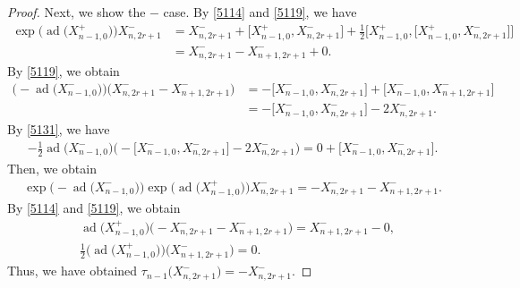 \documentclass[10pt,a4paper]{amsart}
\numberwithin{equation}{section}
\theoremstyle{definition}
\DeclareMathOperator{\ad}{ad}
\begin{document}
\begin{proof}
Next, we show the $-$ case. By \eqref{5114} and \eqref{5119}, we have
\begin{align*}
\exp\bigl(\ad\bigl(X^+_{n-1,0}\bigr)\bigr)X^-_{n,2r+1}&=X^-_{n,2r+1}+\bigl[X^+_{n-1,0},X^-_{n,2r+1}\bigr]+\frac{1}{2}\bigl[X^+_{n-1,0},\bigl[X^+_{n-1,0},X^-_{n,2r+1}\bigr]\bigr]\\
&=X^-_{n,2r+1}-X^-_{n+1,2r+1}+0.
\end{align*}
By \eqref{5119}, we obtain
\begin{align*}
\bigl(-\ad\bigl(X^-_{n-1,0}\bigr)\bigr)\bigl(X^-_{n,2r+1}-X^-_{n+1,2r+1}\bigr)&=-\bigl[X^-_{n-1,0},X^-_{n,2r+1}\bigr]+\bigl[X^-_{n-1,0},X^-_{n+1,2r+1}\bigr]\\
&=-\bigl[X^-_{n-1,0},X^-_{n,2r+1}\bigr]-2X^-_{n,2r+1}.
\end{align*}
By \eqref{5131}, we have
\begin{align*}
-\frac{1}{2}\ad\bigl(X^-_{n-1,0}\bigr)\bigl(-\bigl[X^-_{n-1,0},X^-_{n,2r+1}\bigr]-2X^-_{n,2r+1}\bigr)=0+\bigl[X^-_{n-1,0},X^-_{n,2r+1}\bigr].
\end{align*}
Then, we obtain
\begin{align*}
\exp\bigl(-\ad\bigl(X^-_{n-1,0}\bigr)\bigr)\exp\bigl(\ad\bigl(X^+_{n-1,0}\bigr)\bigr)X^-_{n,2r+1} =-X^-_{n,2r+1}-X^-_{n+1,2r+1}.
\end{align*}
By \eqref{5114} and \eqref{5119}, we obtain
\begin{align*}
& \ad\bigl(X^+_{n-1,0}\bigr)\bigl(-X^-_{n,2r+1}-X^-_{n+1,2r+1}\bigr) =X^-_{n+1,2r+1}-0,
\\
& \frac{1}{2}\bigl(\ad\bigl(X^+_{n-1,0}\bigr)\bigr)\bigl(X^-_{n+1,2r+1}\bigr)=0.
\end{align*}
Thus, we have obtained $\tau_{n-1}\bigl(X^-_{n,2r+1}\bigr)=-X^-_{n,2r+1}$.
\end{proof}
\end{document}
